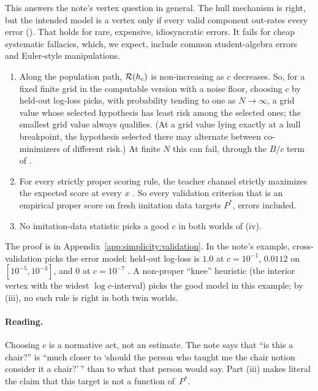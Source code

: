 This answers the note's vertex question in general. The hull mechanism is right, but the intended model is a vertex only if every valid component out-rates every error (). That holds for rare, expensive, idiosyncratic errors. It fails for cheap systematic fallacies, which, we expect, include common student-algebra errors and Euler-style manipulations.

\begin{theorem}\label{thm:simplicity:validation}
\leavevmode
\begin{enumerate}[label=(\roman*)]
\item Along the population path, $\mathcal R(h_c)$ is non-increasing as $c$ decreases. So, for a fixed finite grid in the computable version with a noise floor, choosing $c$ by held-out log-loss picks, with probability tending to one as $N\to\infty$, a grid value whose selected hypothesis has least risk among the selected ones; the smallest grid value always qualifies. (At a grid value lying exactly at a hull breakpoint, the hypothesis selected there may alternate between co-minimizers of different risk.) At finite $N$ this can fail, through the $B/c$ term of .
\item For every strictly proper scoring rule, the teacher channel strictly maximizes the expected score at every $x$ \citep{gneiting2007strictly}. So every validation criterion that is an empirical proper score on fresh imitation data targets $P^*$, errors included.
\item No imitation-data statistic picks a good $c$ in both worlds of (iv).
\end{enumerate}
\end{theorem}

The proof is in Appendix~\ref{app:simplicity:validation}. In the note's example, cross-validation picks the error model: held-out log-loss is $1.0$ at $c=10^{-1}$, $0.0112$ on $[10^{-5},10^{-3}]$, and $0$ at $c=10^{-7}$ . A non-proper ``knee'' heuristic (the interior vertex with the widest $\log c$-interval) picks the good model in this example; by (iii), no such rule is right in both twin worlds.

\paragraph{Reading.} Choosing $c$ is a normative act, not an estimate. The note says that ``is this a chair?'' is ``much closer to `should the person who taught me the chair notion consider it a chair?'\,'' than to what that person would say. Part (iii) makes literal the claim that this target is not a function of~$P^*$.

